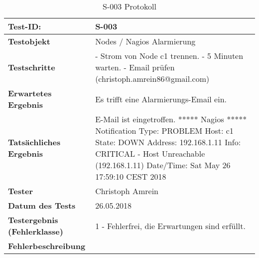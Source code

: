 \begin{table}[H]
\centering
\begin{tabular}{p{4.5cm}p{11.5cm}}
\hline
\cellcolor{heading}\textbf{Test-ID:} & \textbf{S-003} \\\hline
\cellcolor{heading}\textbf{Testobjekt} & Nodes / Nagios Alarmierung\\\hline
\cellcolor{heading}\textbf{Testschritte} & 
- Strom von Node c1 trennen. \newline
- 5 Minuten warten. \newline
- Email prüfen (christoph.amrein86@gmail.com) \\\hline
\cellcolor{heading}\textbf{Erwartetes Ergebnis} & Es trifft eine Alarmierungs-Email ein. \\\hline
\cellcolor{heading}\textbf{Tatsächliches Ergebnis} &
E-Mail ist eingetroffen. \newline
***** Nagios ***** \newline
Notification Type: PROBLEM \newline
Host: c1 \newline
State: DOWN \newline
Address: 192.168.1.11 \newline
Info: CRITICAL - Host Unreachable (192.168.1.11) \newline
Date/Time: Sat May 26 17:59:10 CEST 2018 \newline
 \\\hline
\cellcolor{heading}\textbf{Tester} & Christoph Amrein  \\\hline
\cellcolor{heading}\textbf{Datum des Tests} & 26.05.2018  \\\hline
\cellcolor{heading}\textbf{Testergebnis \newline (Fehlerklasse)} & 1 - Fehlerfrei, die Erwartungen sind erfüllt. \\\hline
\cellcolor{heading}\textbf{Fehlerbeschreibung} &\\\hline
\end{tabular}
\caption{S-003 Protokoll}
\end{table}

